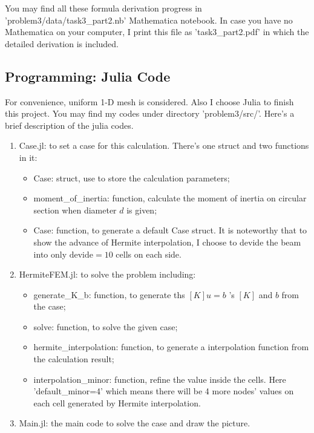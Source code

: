 You may find all these formula derivation progress in 'problem3/data/task3\_part2.nb' Mathematica notebook. 
In case you have no Mathematica on your computer, I print this file as 'task3\_part2.pdf' in which the detailed derivation is included.



\subsection{Programming: Julia Code}

For convenience, uniform 1-D mesh is considered. 
Also I choose Julia to finish this project. 
You may find my codes under directory 'problem3/src/'. 
Here's a brief description of the julia codes.

\begin{enumerate}
    \item Case.jl: to set a case for this calculation. There's one struct and two functions in it:
    \begin{itemize}
        \item Case: struct, use to store the calculation parameters;
        \item moment\_of\_inertia: function, calculate the moment of inertia on circular section when diameter $d$ is given;
        \item Case: function, to generate a default Case struct. It is noteworthy that to show the advance of Hermite interpolation, I choose to devide the beam into only $\text{devide}=10$ cells on each side.
    \end{itemize}
    \item HermiteFEM.jl: to solve the problem including:
    \begin{itemize}
        \item generate\_K\_b: function, to generate ths $[K]u=b$ 's $[K]$ and $b$ from the case;
        \item solve: function, to solve the given case;
        \item hermite\_interpolation: function, to generate a interpolation function from the calculation result;
        \item interpolation\_minor: function, refine the value inside the cells. Here 'default\_minor=4' which means there will be 4 more nodes' values on each cell generated by Hermite interpolation.
    \end{itemize}
    \item Main.jl: the main code to solve the case and draw the picture.
\end{enumerate}

